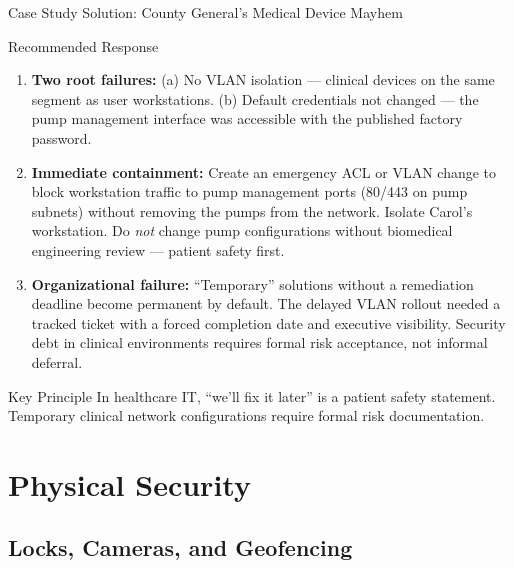 \documentclass[aspectratio=169]{beamer}  %
\begin{document}
\begin{frame}{Case Study Solution: County General's Medical Device Mayhem}
    \begin{exampleblock}{Recommended Response}
        \footnotesize
        \begin{enumerate}
            \item \textbf{Two root failures:} (a) No VLAN isolation --- clinical devices on the same segment as user workstations. (b) Default credentials not changed --- the pump management interface was accessible with the published factory password.
            \item \textbf{Immediate containment:} Create an emergency ACL or VLAN change to block workstation traffic to pump management ports (80/443 on pump subnets) without removing the pumps from the network. Isolate Carol's workstation. Do \emph{not} change pump configurations without biomedical engineering review --- patient safety first.
            \item \textbf{Organizational failure:} ``Temporary'' solutions without a remediation deadline become permanent by default. The delayed VLAN rollout needed a tracked ticket with a forced completion date and executive visibility. Security debt in clinical environments requires formal risk acceptance, not informal deferral.
        \end{enumerate}
    \end{exampleblock}
    \begin{alertblock}{Key Principle}
        \footnotesize
        In healthcare IT, ``we'll fix it later'' is a patient safety statement. Temporary clinical network configurations require formal risk documentation.
    \end{alertblock}
\end{frame}

\section{Physical Security}
\subsection{Locks, Cameras, and Geofencing}

\end{document}
